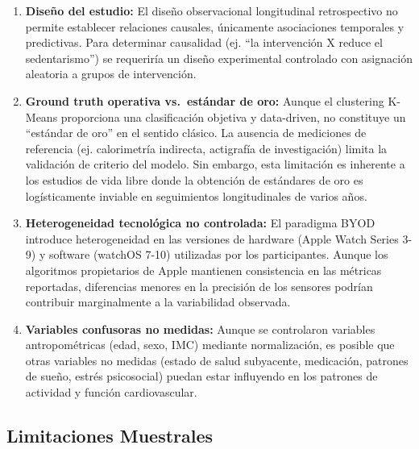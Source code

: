 \begin{enumerate}
    \item \textbf{Diseño del estudio:} El diseño observacional longitudinal retrospectivo no permite establecer relaciones causales, únicamente asociaciones temporales y predictivas. Para determinar causalidad (ej. ``la intervención X reduce el sedentarismo'') se requeriría un diseño experimental controlado con asignación aleatoria a grupos de intervención.
    
    \item \textbf{Ground truth operativa vs.\ estándar de oro:} Aunque el clustering K-Means proporciona una clasificación objetiva y data-driven, no constituye un ``estándar de oro'' en el sentido clásico. La ausencia de mediciones de referencia (ej. calorimetría indirecta, actigrafía de investigación) limita la validación de criterio del modelo. Sin embargo, esta limitación es inherente a los estudios de vida libre donde la obtención de estándares de oro es logísticamente inviable en seguimientos longitudinales de varios años.
    
    \item \textbf{Heterogeneidad tecnológica no controlada:} El paradigma BYOD introduce heterogeneidad en las versiones de hardware (Apple Watch Series 3-9) y software (watchOS 7-10) utilizadas por los participantes. Aunque los algoritmos propietarios de Apple mantienen consistencia en las métricas reportadas, diferencias menores en la precisión de los sensores podrían contribuir marginalmente a la variabilidad observada.
    
    \item \textbf{Variables confusoras no medidas:} Aunque se controlaron variables antropométricas (edad, sexo, IMC) mediante normalización, es posible que otras variables no medidas (estado de salud subyacente, medicación, patrones de sueño, estrés psicosocial) puedan estar influyendo en los patrones de actividad y función cardiovascular.
\end{enumerate}

\subsection{Limitaciones Muestrales}
\label{subsec:limitaciones_muestrales}

